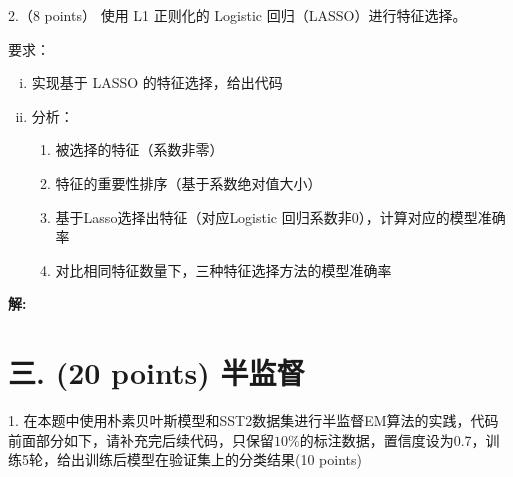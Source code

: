 \documentclass[8pt]{article}
\begin{document}
2.（8 points） 使用 L1 正则化的 Logistic 回归（LASSO）进行特征选择。

要求：
\begin{enumerate}[(i)]
    \item 实现基于 LASSO 的特征选择，给出代码
    \item 分析：
    \begin{enumerate}
        \item 被选择的特征（系数非零）
        \item 特征的重要性排序（基于系数绝对值大小）
        \item 基于Lasso选择出特征（对应Logistic 回归系数非0），计算对应的模型准确率
        \item 对比相同特征数量下，三种特征选择方法的模型准确率
    \end{enumerate}
\end{enumerate}

\textbf{\large 解:}

\vspace{3em}


\newpage
\section*{三. (20 points) 半监督}
1. 在本题中使用朴素贝叶斯模型和SST2数据集进行半监督EM算法的实践，代码前面部分如下，请补充完后续代码，只保留$10\%$的标注数据，置信度设为0.7，训练5轮，给出训练后模型在验证集上的分类结果(10 points)
\end{document}
